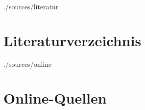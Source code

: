 \documentclass[11pt,a4paper]{report}
\begin{document}
\tableofcontents









\begin{btSect}{./sources/literatur} %
\section*{Literaturverzeichnis}
\btPrintCited
\end{btSect}
\begin{btSect}{./sources/online}
\section*{Online-Quellen}
\btPrintCited
\end{btSect}
\end{document}
